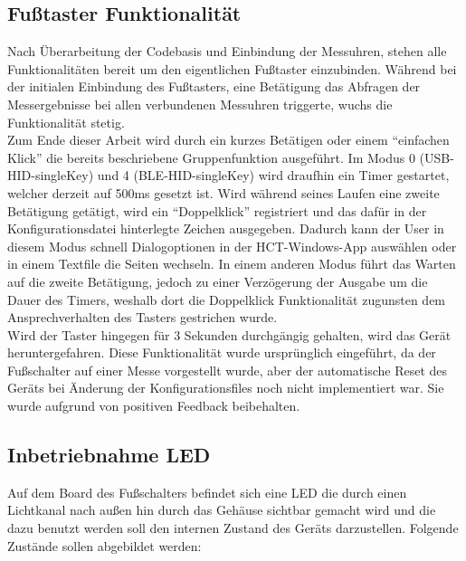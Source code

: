 \subsection{Fußtaster Funktionalität}
Nach Überarbeitung der Codebasis und Einbindung der Messuhren, stehen alle Funktionalitäten bereit um den eigentlichen Fußtaster einzubinden. Während bei der initialen Einbindung des Fußtasters, eine Betätigung das Abfragen der Messergebnisse bei allen verbundenen Messuhren triggerte, wuchs die Funktionalität stetig.\\
Zum Ende dieser Arbeit wird durch ein kurzes Betätigen oder einem ``einfachen Klick'' die bereits beschriebene Gruppenfunktion ausgeführt. Im Modus 0 (USB-\ac{HID}-singleKey) und 4 (\ac{BLE}-\ac{HID}-singleKey) wird draufhin ein Timer gestartet, welcher derzeit auf 500ms gesetzt ist. Wird während seines Laufen eine zweite Betätigung getätigt, wird ein ``Doppelklick'' registriert und das dafür in der Konfigurationsdatei hinterlegte Zeichen ausgegeben. Dadurch kann der User in diesem Modus schnell Dialogoptionen in der \ac{HCT}-Windows-App auswählen oder in einem Textfile die Seiten wechseln. In einem anderen Modus führt das Warten auf die zweite Betätigung, jedoch zu einer Verzögerung der Ausgabe um die Dauer des Timers, weshalb dort die Doppelklick Funktionalität zugunsten dem Ansprechverhalten des Tasters gestrichen wurde.\\
Wird der Taster hingegen für 3 Sekunden durchgängig gehalten, wird das Gerät heruntergefahren. Diese Funktionalität wurde ursprünglich eingeführt, da der Fußschalter auf einer Messe vorgestellt wurde, aber der automatische Reset des Geräts bei Änderung der Konfigurationsfiles noch nicht implementiert war. Sie wurde aufgrund von positiven Feedback beibehalten.

\subsection{Inbetriebnahme LED}
Auf dem Board des Fußschalters befindet sich eine \ac{LED} die durch einen Lichtkanal nach außen hin durch das Gehäuse sichtbar gemacht wird und die dazu benutzt werden soll den internen Zustand des Geräts darzustellen. Folgende Zustände sollen abgebildet werden: 

